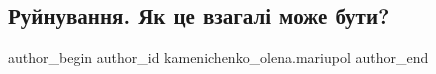  
 
 
 
 

\subsection{Руйнування. Як це взагалі може бути?}
\label{sec:03_07_2022.fb.kamenichenko_olena.mariupol.1.ruinuvannya__yak_tse}

\ifcmt
 author_begin
   author_id kamenichenko_olena.mariupol
 author_end
\fi
